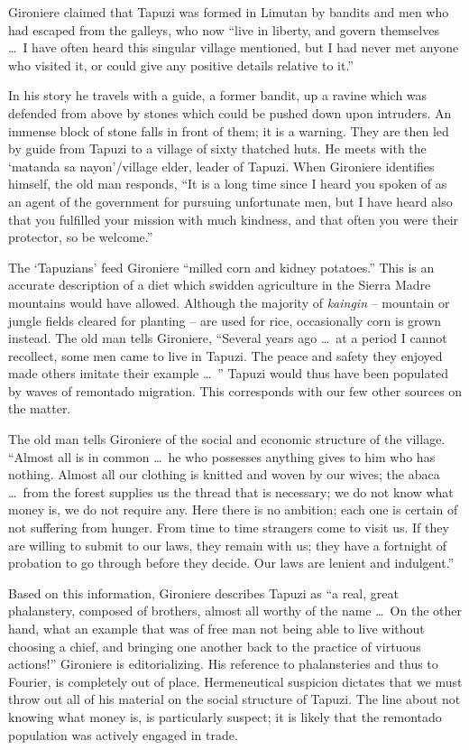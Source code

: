 Gironiere claimed that Tapuzi was formed in Limutan by bandits and men who had escaped from the galleys, who now \enquote{live in liberty, and govern themselves \ldots\ I have often heard this singular village mentioned, but I had never met anyone who visited it, or could give any positive details relative to it.}

In his story he travels with a guide, a former bandit, up a ravine which was defended from above by stones which could be pushed down upon intruders. An immense block of stone falls in front of them; it is a warning. They are then led by guide from Tapuzi to a village of sixty thatched huts. He meets with the \enquote*{matanda sa nayon}/village elder, leader of Tapuzi. When Gironiere identifies himself, the old man responds, \enquote{It is a long time since I heard you spoken of as an agent of the government for pursuing unfortunate men, but I have heard also that you fulfilled your mission with much kindness, and that often you were their protector, so be welcome.}

The \enquote*{Tapuzians} feed Gironiere \enquote{milled corn and kidney potatoes.} This is an accurate description of a diet which swidden agriculture in the Sierra Madre mountains would have allowed. Although the majority of \textit{kaingin} -- mountain or jungle fields cleared for planting -- are used for rice, occasionally corn is grown instead. The old man tells Gironiere, \enquote{Several years ago \ldots\ at a period I cannot recollect, some men came to live in Tapuzi. The peace and safety they enjoyed made others imitate their example \ldots\ } Tapuzi would thus have been populated by waves of remontado migration. This corresponds with our few other sources on the matter.

The old man tells Gironiere of the social and economic structure of the village. \enquote{Almost all is in common \ldots\ he who possesses anything gives to him who has nothing. Almost all our clothing is knitted and woven by our wives; the abaca \ldots\ from the forest supplies us the thread that is necessary; we do not know what money is, we do not require any. Here there is no ambition; each one is certain of not suffering from hunger. From time to time strangers come to visit us. If they are willing to submit to our laws, they remain with us; they have a fortnight of probation to go through before they decide. Our laws are lenient and indulgent.}

Based on this information, Gironiere describes Tapuzi as \enquote{a real, great phalanstery, composed of brothers, almost all worthy of the name \ldots\ On the other hand, what an example that was of free man not being able to live without choosing a chief, and bringing one another back to the practice of virtuous actions!} Gironiere is editorializing. His reference to phalansteries and thus to Fourier, is completely out of place. Hermeneutical suspicion dictates that we must throw out all of his material on the social structure of Tapuzi. The line about not knowing what money is, is particularly suspect; it is likely that the remontado population was actively engaged in trade.

